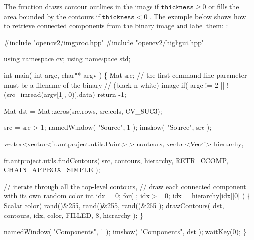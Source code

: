 The function draws contour outlines in the image if $\texttt{thickness} \ge 0$ or fills the area bounded by the contours if $\texttt{thickness}<0$ . The example below shows how to retrieve connected components from the binary image and label them\+: \+: 
\begin{DoxyPre}
\begin{DoxyCode}
\textcolor{preprocessor}{#include "opencv2/imgproc.hpp"}
\textcolor{preprocessor}{#include "opencv2/highgui.hpp"}

\textcolor{keyword}{using namespace }cv;
\textcolor{keyword}{using namespace }std;

\textcolor{keywordtype}{int} main( \textcolor{keywordtype}{int} argc, \textcolor{keywordtype}{char}** argv )
\{
    Mat src;
    \textcolor{comment}{// the first command-line parameter must be a filename of the binary}
    \textcolor{comment}{// (black-n-white) image}
    \textcolor{keywordflow}{if}( argc != 2 || !(src=imread(argv[1], 0)).data)
        \textcolor{keywordflow}{return} -1;

    Mat dst = Mat::zeros(src.rows, src.cols, CV\_8UC3);

    src = src > 1;
    namedWindow( \textcolor{stringliteral}{"Source"}, 1 );
    imshow( \textcolor{stringliteral}{"Source"}, src );

    vector<vector<fr.antproject.utils.Point> > contours;
    vector<Vec4i> hierarchy;

    \hyperlink{group__imgproc__shape_gad95c6aa001eb4a24cc898ff08dcb81da}{fr.antproject.utils.findContours}( src, contours, hierarchy,
        RETR\_CCOMP, CHAIN\_APPROX\_SIMPLE );

    \textcolor{comment}{// iterate through all the top-level contours,}
    \textcolor{comment}{// draw each connected component with its own random color}
    \textcolor{keywordtype}{int} idx = 0;
    \textcolor{keywordflow}{for}( ; idx >= 0; idx = hierarchy[idx][0] )
    \{
        Scalar color( rand()&255, rand()&255, rand()&255 );
        \hyperlink{group__imgproc__draw_ga7f6b348c865b74b400fb05f3ed22152c}{drawContours}( dst, contours, idx, color, FILLED, 8, hierarchy );
    \}

    namedWindow( \textcolor{stringliteral}{"Components"}, 1 );
    imshow( \textcolor{stringliteral}{"Components"}, dst );
    waitKey(0);
\}
\end{DoxyCode}
 \end{DoxyPre}
 


